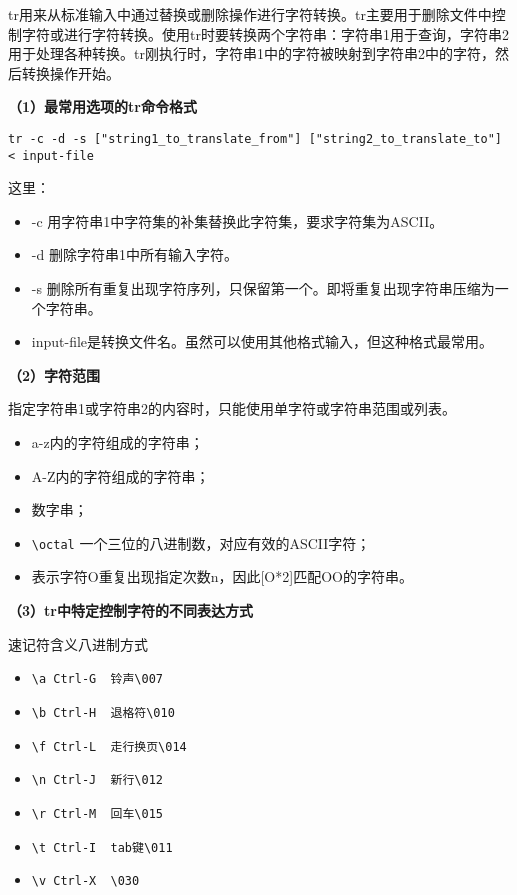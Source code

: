 tr用来从标准输入中通过替换或删除操作进行字符转换。tr主要用于删除文件中控制字符或进行字符转换。使用tr时要转换两个字符串：字符串1用于查询，字符串2用于处理各种转换。tr刚执行时，字符串1中的字符被映射到字符串2中的字符，然后转换操作开始。

\textbf{（1）最常用选项的tr命令格式}

\verb|tr -c -d -s ["string1_to_translate_from"] ["string2_to_translate_to"] < input-file|

这里：
\begin{itemize}
\item -c 用字符串1中字符集的补集替换此字符集，要求字符集为ASCII。
\item -d 删除字符串1中所有输入字符。
\item -s 删除所有重复出现字符序列，只保留第一个。即将重复出现字符串压缩为一个字符串。
\item input-file是转换文件名。虽然可以使用其他格式输入，但这种格式最常用。
\end{itemize}

\textbf{（2）字符范围}

指定字符串1或字符串2的内容时，只能使用单字符或字符串范围或列表。
\begin{itemize}
\item [a-z] a-z内的字符组成的字符串；
\item [A-Z] A-Z内的字符组成的字符串；
\item [0-9] 数字串；
\item \verb|\octal| 一个三位的八进制数，对应有效的ASCII字符；
\item [O*n] 表示字符O重复出现指定次数n，因此[O*2]匹配OO的字符串。
\end{itemize}

\textbf{（3）tr中特定控制字符的不同表达方式}

速记符含义八进制方式
\begin{itemize}
\item \verb|\a Ctrl-G  铃声\007|
\item \verb|\b Ctrl-H  退格符\010|
\item \verb|\f Ctrl-L  走行换页\014|
\item \verb|\n Ctrl-J  新行\012|
\item \verb|\r Ctrl-M  回车\015|
\item \verb|\t Ctrl-I  tab键\011|
\item \verb|\v Ctrl-X  \030|
\end{itemize}



